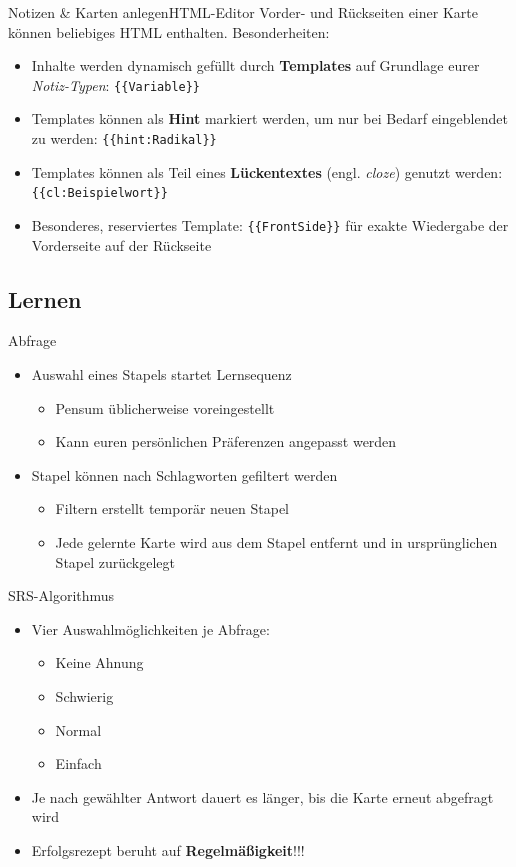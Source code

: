 \documentclass[aspectratio=169,compress]{beamer}
\begin{document}
\begin{frame}{Notizen \& Karten anlegen}{HTML-Editor}
	Vorder- und Rückseiten einer Karte können beliebiges HTML enthalten. Besonderheiten:
	\begin{itemize}
		\item Inhalte werden dynamisch gefüllt durch \textbf{Templates} auf Grundlage eurer \textit{Notiz-Typen}: \texttt{\{\{Variable\}\}}
		\item Templates können als \textbf{Hint} markiert werden, um nur bei Bedarf eingeblendet zu werden: \texttt{\{\{hint:Radikal\}\}}
		\item Templates können als Teil eines \textbf{Lückentextes} (engl. \textit{cloze}) genutzt werden: \texttt{\{\{cl:Beispielwort\}\}}
		\item Besonderes, reserviertes Template: \texttt{\{\{FrontSide\}\}} für exakte Wiedergabe der Vorderseite auf der Rückseite
	\end{itemize}
\end{frame}

\subsection{Lernen}

\begin{frame}{Abfrage}
	\begin{itemize}
		\item Auswahl eines Stapels startet Lernsequenz
		\begin{itemize}
			\item Pensum üblicherweise voreingestellt
			\item Kann euren persönlichen Präferenzen angepasst werden
		\end{itemize}
		\item Stapel können nach Schlagworten gefiltert werden
		\begin{itemize}
			\item Filtern erstellt temporär neuen Stapel
			\item Jede gelernte Karte wird aus dem Stapel entfernt und in ursprünglichen Stapel zurückgelegt
		\end{itemize}
	\end{itemize}
\end{frame}

\begin{frame}{SRS-Algorithmus}
	\begin{itemize}
		\item Vier Auswahlmöglichkeiten je Abfrage:
		\begin{itemize}
			\item Keine Ahnung
			\item Schwierig
			\item Normal
			\item Einfach 
		\end{itemize}
		\item Je nach gewählter Antwort dauert es länger, bis die Karte erneut abgefragt wird
		\item Erfolgsrezept beruht auf \textbf{Regelmäßigkeit}!!!
	\end{itemize}
\end{frame}
\end{document}
